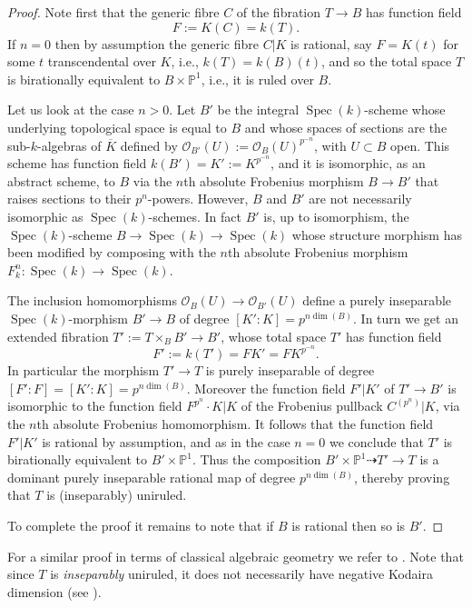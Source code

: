 \documentclass[12pt,reqno]{amsart}
\theoremstyle{definition}
\newcommand{\su}{\subset}
\newcommand{\ttto}{\dashrightarrow} %
\newcommand{\ov}{\overline}
\newcommand{\PP}{\mathbb{P}}
\newcommand{\OO}{\mathcal{O}}
\DeclareMathOperator{\Spec}{Spec}%
\begin{document}
\begin{proof}

Note first that the generic fibre $C$ of the fibration $T\to B$ has function field
\[ F := K(C) = k(T). \]
If $n=0$ then by assumption the generic fibre $C|K$ is rational, say $F=K(t)$ for some $t$ transcendental over $K$, i.e., $k(T)=k(B)(t)$, and so the total space $T$ is  birationally equivalent to $B\times \PP^1$, i.e., it is ruled over $B$. 

Let us look at the case $n>0$.
Let $B'$ be the integral $\Spec(k)$-scheme whose underlying topological space is equal to $B$ and whose spaces of sections are the sub-$k$-algebras of $\ov K$ defined by
$ \OO_{B'}(U) := \OO_B(U)^{p^{-n}}$, with $U\su B$ open.
This scheme has function field $k(B') = K' := K^{p^{-n}}$, and it is isomorphic, as an abstract scheme, to $B$ via the $n$th absolute Frobenius morphism $B \to B'$ that raises sections to their $p^n$-powers.
However, $B$ and $B'$ are not necessarily isomorphic as $\Spec(k)$-schemes.
In fact $B'$ is, up to isomorphism, the $\Spec(k)$-scheme
$ B \to \Spec(k) \to \Spec(k) $
whose structure morphism has been modified by composing with the $n$th absolute Frobenius morphism $F_k^n : \Spec(k) \to \Spec(k)$.

The inclusion homomorphisms $\OO_B(U)\to \OO_{B'}(U)$ define a purely inseparable $\Spec(k)$-morphism
$ B' \to B$
of degree $[K':K]=p^{n \dim(B)}$.
In turn we get an extended fibration $T':= T \times_B B'\to B'$, whose total space $T'$ has function field 
\[ F' := k(T') = F K' = F K^{p^{-n}}. \]
In particular the morphism $T' \to T$ is purely inseparable of degree $[F':F]=[K':K]=p^{n \dim (B)}$.
Moreover the function field $F'|K'$ of $T'\to B'$ is isomorphic to the function field $F^{p^n} {\cdot} K|K$ of the Frobenius pullback $C^{(p^n)}|K$, via the $n$th absolute Frobenius homomorphism.
It follows that the function field $F'|K'$ is rational by assumption, and as in the case $n=0$ we conclude that $T'$ is birationally equivalent to $B'\times \PP^1$.
Thus the composition 
$ B'\times \PP^1 \ttto T' \to T $ is a dominant purely inseparable rational map of degree $p^{n \dim(B)}$,
thereby proving that $T$ is (inseparably) uniruled. 

To complete the proof it remains to note that if $B$ is rational then so is $B'$.
\end{proof}

For a similar proof in terms of classical algebraic geometry we refer to \cite[Section~5]{HiSt23}.
Note that since $T$ is \emph{inseparably} uniruled, it does not necessarily have negative Kodaira dimension (see \cite[p.\,265]{Lied13}).
\end{document}
